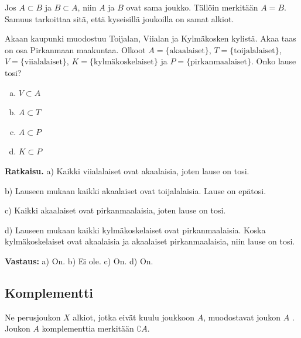 Jos $A\subset B$ ja $B\subset A$, niin  $A$ ja $B$ ovat sama joukko. Tällöin merkitään $A=B$. Samuus tarkoittaa sitä, että kyseisillä joukoilla on samat alkiot. %

\newpage

\begin{esimerkki}
Akaan kaupunki muodostuu Toijalan, Viialan ja Kylmäkosken
kylistä. Akaa taas on osa Pirkanmaan maakuntaa. Olkoot $A
= \{\textrm{akaalaiset}\}$, $T = \{\textrm{toijalalaiset}\}$, $V
= \{\textrm{viialalaiset}\}$, $K = \{\textrm{kylmäkoskelaiset}\} $ ja $P = \{\textrm{pirkanmaalaiset}\}$. Onko lause tosi?

\begin{enumerate}[a)]
\item $V \subset A$
\item $A \subset T$
\item $A \subset P$
\item $K \subset P$
\end{enumerate}


{\bf Ratkaisu.}
a) Kaikki viialalaiset ovat akaalaisia, joten lause on
tosi.

b) Lauseen mukaan kaikki akaalaiset ovat toijalalaisia.
Lause on epätosi.

c) Kaikki akaalaiset ovat pirkanmaalaisia, joten lause on
tosi.

d) Lauseen mukaan kaikki kylmäkoskelaiset ovat
pirkanmaalaisia. Koska kylmäkoskelaiset ovat akaalaisia
ja akaalaiset pirkanmaalaisia, niin lause on tosi.

{\bf Vastaus:} a) On. b) Ei ole. c) On. d) On.
\end{esimerkki}

\subsection*{Komplementti}
Ne perusjoukon $X$ alkiot, jotka eivät kuulu joukkoon $A$, muodostavat joukon $A$ . Joukon $A$ komplementtia merkitään $\complement A$.

\begin{center}



\end{center}

